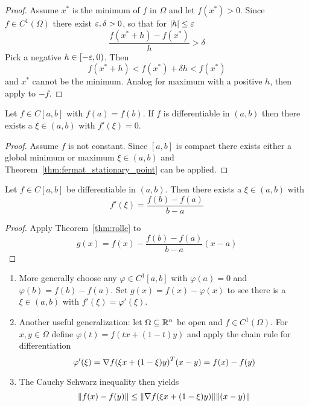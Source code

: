 \begin{proof}
Assume \( x^* \) is the minimum of \( f \) in \( \Omega \) and let \( f(x^*) > 0 \). 
Since \( f \in C^1(\Omega) \) there exist \( \varepsilon, \delta > 0 \), so that for \( |h| \le \varepsilon \)
\[
    \frac{f(x^* + h) - f(x^*)}{h} > \delta
\]
Pick a negative \( h \in [-\varepsilon, 0) \). Then 
\[
     f(x^* + h) < f(x^*) +  \delta h < f(x^*) 
\]
and \( x^* \) cannot be the minimum. Analog for maximum with a positive \( h \), then apply to \( -f \).
\end{proof}
\bigskip


\begin{theorem}[Rolle]\label{thm:rolle}
Let \( f \in C[a,b] \) with \( f(a) = f(b) \). If \( f \) is differentiable in \( (a, b) \) then 
there exists a \( \xi \in (a,b) \) with \( f'(\xi) = 0 \).
\end{theorem}

\begin{proof}
Assume \( f \) is not constant. Since \( [a,b] \) is compact there exists either a global minimum or maximum 
\( \xi \in (a,b) \) and Theorem~\ref{thm:fermat_stationary_point} can be applied.
\end{proof}
\bigskip


\begin{theorem}\label{thm:mean_value}
Let \( f \in C[a,b] \) be differentiable in \( (a, b) \). Then there exists a \( \xi \in (a,b) \) with 
\[
    f'(\xi) = \frac{f(b) - f(a)}{b - a}
\]
\end{theorem}

\begin{proof}
Apply Theorem~\ref{thm:rolle} to 
\[
    g(x) = f(x) - \frac{f(b) - f(a)}{b - a} (x -a) 
\]
\end{proof}
\bigskip


\begin{remark}\hfill
    \begin{enumerate}
        \item More generally choose any \( \varphi \in C^1[a,b] \) with \( \varphi(a) = 0 \) and 
            \( \varphi(b) = f(b) - f(a) \). Set \( g(x) = f(x) - \varphi(x) \) to see there is a \( \xi \in (a,b) \) 
            with \( f'(\xi) = \varphi'(\xi)\). 
        \item Another useful generalization: let \( \Omega \subseteq \mathbb{R}^n \) be open and \( f \in C^1(\Omega) \). For
            \( x, y \in \Omega \) define \( \varphi(t) = f(tx + (1 - t)y) \) and apply the chain rule for differentiation
            \[
                 \varphi'(\xi) = \nabla {f(\xi x + (1 - \xi)y)}^T(x - y) = f(x) - f(y)
            \]
        \item The Cauchy Schwarz inequality then yields
            \[
                  \|f(x) - f(y)\| \le \|\nabla f(\xi x + (1 - \xi)y)\| \|(x - y)\|
            \]
    \end{enumerate}
\end{remark}
\bigskip


